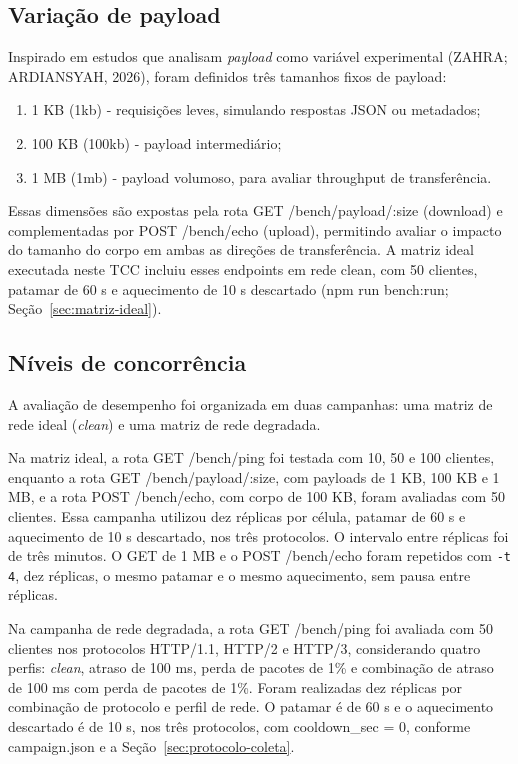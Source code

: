 \subsection{Variação de payload}

Inspirado em estudos que analisam \textit{payload} como variável experimental (ZAHRA; ARDIANSYAH, 2026), foram definidos três tamanhos fixos de payload:

\begin{enumerate}[label=\alph*)]
\item 1 KB (1kb) - requisições leves, simulando respostas JSON ou metadados;
\item 100 KB (100kb) - payload intermediário;
\item 1 MB (1mb) - payload volumoso, para avaliar throughput de transferência.
\end{enumerate}

Essas dimensões são expostas pela rota GET /bench/payload/:size (download) e complementadas por POST /bench/echo (upload), permitindo avaliar o impacto do tamanho do corpo em ambas as direções de transferência. A matriz ideal executada neste TCC incluiu esses endpoints em rede clean, com 50 clientes, patamar de 60 s e aquecimento de 10 s descartado (npm run bench:run; Seção~\ref{sec:matriz-ideal}).

\subsection{Níveis de concorrência}

A avaliação de desempenho foi organizada em duas campanhas: uma matriz de rede ideal (\textit{clean}) e uma matriz de rede degradada. 

Na matriz ideal, a rota GET /bench/ping foi testada com 10, 50 e 100 clientes, enquanto a rota GET /bench/payload/:size, com payloads de 1 KB, 100 KB e 1 MB, e a rota POST /bench/echo, com corpo de 100 KB, foram avaliadas com 50 clientes. Essa campanha utilizou dez réplicas por célula, patamar de 60 s e aquecimento de 10 s descartado, nos três protocolos. O intervalo entre réplicas foi de três minutos. O GET de 1 MB e o POST /bench/echo foram repetidos com \texttt{-t 4}, dez réplicas, o mesmo patamar e o mesmo aquecimento, sem pausa entre réplicas.

Na campanha de rede degradada, a rota GET /bench/ping foi avaliada com 50 clientes nos protocolos HTTP/1.1, HTTP/2 e HTTP/3, considerando quatro perfis: \textit{clean}, atraso de 100 ms, perda de pacotes de 1\% e combinação de atraso de 100 ms com perda de pacotes de 1\%. Foram realizadas dez réplicas por combinação de protocolo e perfil de rede. O patamar é de 60 s e o aquecimento descartado é de 10 s, nos três protocolos, com cooldown\_sec = 0, conforme campaign.json e a Seção~\ref{sec:protocolo-coleta}.

